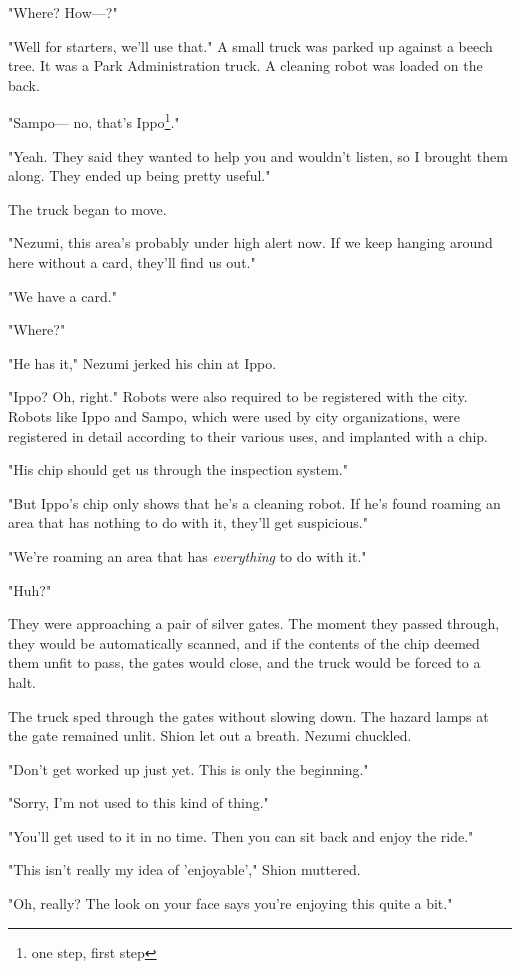 "Where? How---?"

"Well for starters, we'll use that." A small truck was parked up against
a beech tree. It was a Park Administration truck. A cleaning robot was
loaded on the back.

"Sampo--- no, that's Ippo\footnote{one step, first step}."

"Yeah. They said they wanted to help you and wouldn't listen, so I
brought them along. They ended up being pretty useful."

The truck began to move.

"Nezumi, this area's probably under high alert now. If we keep hanging
around here without a card, they'll find us out."

"We have a card."

"Where?"

"He has it," Nezumi jerked his chin at Ippo.

"Ippo? Oh, right." Robots were also required to be registered with the
city. Robots like Ippo and Sampo, which were used by city organizations,
were registered in detail according to their various uses, and implanted
with a chip.

"His chip should get us through the inspection system."

"But Ippo's chip only shows that he's a cleaning robot. If he's found
roaming an area that has nothing to do with it, they'll get suspicious."

"We're roaming an area that has \emph{everything} to do with it."

"Huh?"

They were approaching a pair of silver gates. The moment they passed
through, they would be automatically scanned, and if the contents of the
chip deemed them unfit to pass, the gates would close, and the truck
would be forced to a halt.

The truck sped through the gates without slowing down. The hazard lamps
at the gate remained unlit. Shion let out a breath. Nezumi chuckled.

"Don't get worked up just yet. This is only the beginning."

"Sorry, I'm not used to this kind of thing."

"You'll get used to it in no time. Then you can sit back and enjoy the
ride."

"This isn't really my idea of 'enjoyable'," Shion muttered.

"Oh, really? The look on your face says you're enjoying this quite a
bit."

